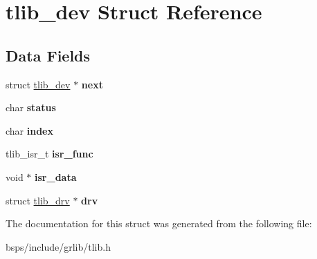 \hypertarget{structtlib__dev}{}\section{tlib\+\_\+dev Struct Reference}
\label{structtlib__dev}
\subsection*{Data Fields}
\begin{DoxyCompactItemize}
\item 
\mbox{\label{structtlib__dev_aaf829ed34dea39962790fc8b09e5ed59}} 
struct \mbox{\hyperlink{structtlib__dev}{tlib\+\_\+dev}} $\ast$ {\bfseries next}
\item 
\mbox{\label{structtlib__dev_a8f4b55ff030af5a0f25915deaf91d03c}} 
char {\bfseries status}
\item 
\mbox{\label{structtlib__dev_a8e96b6c631362dfa761962e3c537a9ad}} 
char {\bfseries index}
\item 
\mbox{\label{structtlib__dev_ad196c0f35fb3a492042843d8ec48518a}} 
tlib\+\_\+isr\+\_\+t {\bfseries isr\+\_\+func}
\item 
\mbox{\label{structtlib__dev_a045a5d79f6bc198d4894a8e16a84f1bd}} 
void $\ast$ {\bfseries isr\+\_\+data}
\item 
\mbox{\label{structtlib__dev_afc0a2ad1fcdc78696d68a4341bbeb6fd}} 
struct \mbox{\hyperlink{structtlib__drv}{tlib\+\_\+drv}} $\ast$ {\bfseries drv}
\end{DoxyCompactItemize}


The documentation for this struct was generated from the following file\+:\begin{DoxyCompactItemize}
\item 
bsps/include/grlib/tlib.\+h\end{DoxyCompactItemize}
